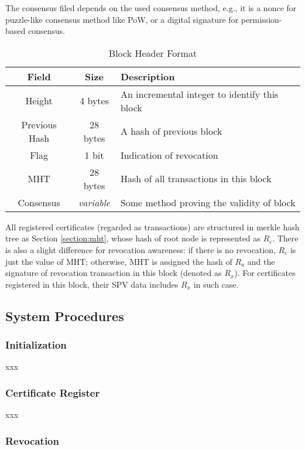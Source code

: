\documentclass[conference]{IEEEtran}
\begin{document}
The consensus filed depends on the used consensus method, e.g., it is a nonce for puzzle-like consensus method like PoW, or a digital signature for permission-based consensus.


\begin{table}[h] 
	\caption{Block Header Format}\label{table:format}
	\centering
	\begin{tabular}{c|c|l}
		\hline
		Field & Size & Description \\
		\hline
		Height & 4 bytes & An incremental integer to identify this block \\
		Previous Hash & 28 bytes & A hash of previous block \\
		Flag & 1 bit & Indication of revocation \\
		MHT & 28 bytes & Hash of all transactions in this block \\
		Consensus & \textit{variable} & Some method proving the validity of block\\
		\hline
	\end{tabular}
\end{table}

All registered certificates (regarded as transactions) are structured in merkle hash tree as Section \ref{section:mht}, whose hash of root node is represented as $R_c$. There is also a slight difference for revocation awareness: if there is no revocation, $R_c$ is just the value of MHT; otherwise, MHT is assigned the hash of $R_a$ and the signature of revocation transaction in this block (denoted as $R_x$). For certificates registered in this block, their SPV data includes $R_x$ in such case.


\subsection{System Procedures}
\subsubsection{Initialization}
xxx

\subsubsection{Certificate Register}
xxx


\subsubsection{Revocation}
\end{document}
